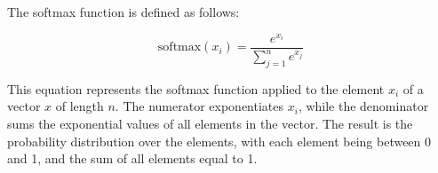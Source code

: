 \documentclass{article}
\begin{document}
The softmax function is defined as follows:

\[
\text{softmax}(x_i) = \frac{e^{x_i}}{\sum_{j=1}^{n} e^{x_j}}
\]

This equation represents the softmax function applied to the element $x_i$ of a vector $x$ of length $n$. The numerator exponentiates $x_i$, while the denominator sums the exponential values of all elements in the vector. The result is the probability distribution over the elements, with each element being between 0 and 1, and the sum of all elements equal to 1.
\end{document}
